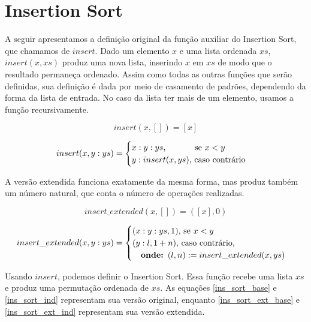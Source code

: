 \documentclass[12pt, oneside, a4paper,english,brazil]{abntex2}
\begin{document}
\section{Insertion Sort}

\qquad A seguir apresentamos a defini\c{c}\~ao original da fun\c{c}\~ao auxiliar do
Insertion Sort, que chamamos de $insert$. Dado um elemento $x$ e uma lista ordenada $xs$,
$insert(x,xs)$ produz uma nova lista, inserindo $x$ em $xs$ de modo que o resultado
permane\c{c}a ordenado. Assim como todas as outras fun\c{c}\~oes que ser\~ao definidas,
sua defini\c{c}\~ao \'e dada por meio de casamento de padr\~oes,
dependendo da forma da lista de entrada. No caso da lista ter mais de um elemento, usamos
a fun\c{c}\~ao recursivamente.

\begin{equation} \label{ins_base}
insert(x, []) = [x]
\end{equation}

\begin{equation} \label{ins_ind}
insert(x, y : ys) =
  \begin{cases}
    x : y : ys \text{, \qquad\,\,\,\,\, se } x < y\\
    y : insert(x, ys) \text{, caso contr\'ario}
  \end{cases}
\end{equation}

\newpage
\qquad A vers\~ao extendida funciona exatamente da mesma forma, mas produz tamb\'em um
n\'umero natural, que conta o n\'umero de opera\c{c}\~oes realizadas.

\begin{equation} \label{ins_ext_base}
insert\_extended(x, []) = ([x], 0)
\end{equation}

\begin{equation} \label{ins_ext_ind}
insert\_extended(x, y : ys) =
  \begin{cases}
    (x : y : ys, 1) \text{, se } x < y\\
    (y : l, 1 + n) \text{, caso contr\'ario,}\\ \text{\quad \textbf{onde: }} (l, n) := insert\_extended(x, ys)
  \end{cases}
\end{equation}

\qquad Usando $insert$, podemos definir o Insertion Sort.
Essa fun\c{c}\~ao recebe uma lista $xs$ e produz uma permuta\c{c}\~ao ordenada de $xs$.
As equa\c{c}\~oes \ref{ins_sort_base} e \ref{ins_sort_ind} representam sua vers\~ao original, enquanto
\ref{ins_sort_ext_base} e \ref{ins_sort_ext_ind} representam sua vers\~ao extendida.
\end{document}
